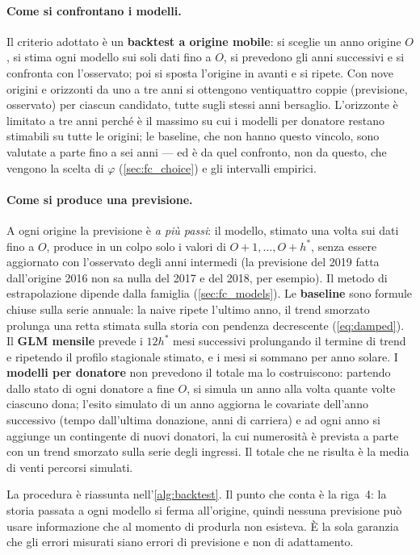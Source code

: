 \paragraph{Come si confrontano i modelli.}
Il criterio adottato è un \textbf{backtest a origine mobile}: si sceglie un
anno origine $O$, si stima ogni modello sui soli dati fino a $O$, si prevedono
gli anni successivi e si confronta con l'osservato; poi si sposta l'origine in
avanti e si ripete. Con nove origini e orizzonti da uno a tre anni si ottengono
ventiquattro coppie (previsione, osservato) per ciascun candidato, tutte sugli
stessi anni bersaglio. L'orizzonte è limitato a tre anni perché è il massimo su
cui i modelli per donatore restano stimabili su tutte le origini; le baseline,
che non hanno questo vincolo, sono valutate a parte fino a sei anni --- ed è da
quel confronto, non da questo, che vengono la scelta di $\varphi$
(\cref{sec:fc_choice}) e gli intervalli empirici.

\paragraph{Come si produce una previsione.}
A ogni origine la previsione è \emph{a più passi}: il modello, stimato una
volta sui dati fino a $O$, produce in un colpo solo i valori di
$O+1, \dots, O+h^*$, senza essere aggiornato con l'osservato degli anni
intermedi (la previsione del 2019 fatta dall'origine 2016 non sa nulla del
2017 e del 2018, per esempio). Il metodo di estrapolazione dipende dalla famiglia
(\cref{sec:fc_models}). Le \textbf{baseline} sono formule chiuse sulla serie
annuale: la naive ripete l'ultimo anno, il trend smorzato prolunga una retta
stimata sulla storia con pendenza decrescente (\cref{eq:damped}). Il
\textbf{GLM mensile} prevede i $12h^*$ mesi successivi prolungando il termine
di trend e ripetendo il profilo stagionale stimato, e i mesi si sommano per
anno solare. I \textbf{modelli per donatore} non prevedono il totale ma lo
costruiscono: partendo dallo stato di ogni donatore a fine $O$, si simula un
anno alla volta quante volte ciascuno dona; l'esito simulato di un anno
aggiorna le covariate dell'anno successivo (tempo dall'ultima donazione, anni
di carriera) e ad ogni anno si aggiunge un contingente di nuovi donatori, la cui
numerosità è prevista a parte con un trend smorzato sulla serie degli
ingressi. Il totale che ne risulta è la media di venti percorsi simulati.

La procedura è riassunta nell'\cref{alg:backtest}. Il punto che conta è la
riga~4: la storia passata a ogni modello si ferma all'origine, quindi nessuna
previsione può usare informazione che al momento di produrla non esisteva. È la
sola garanzia che gli errori misurati siano errori di previsione e non di
adattamento.

